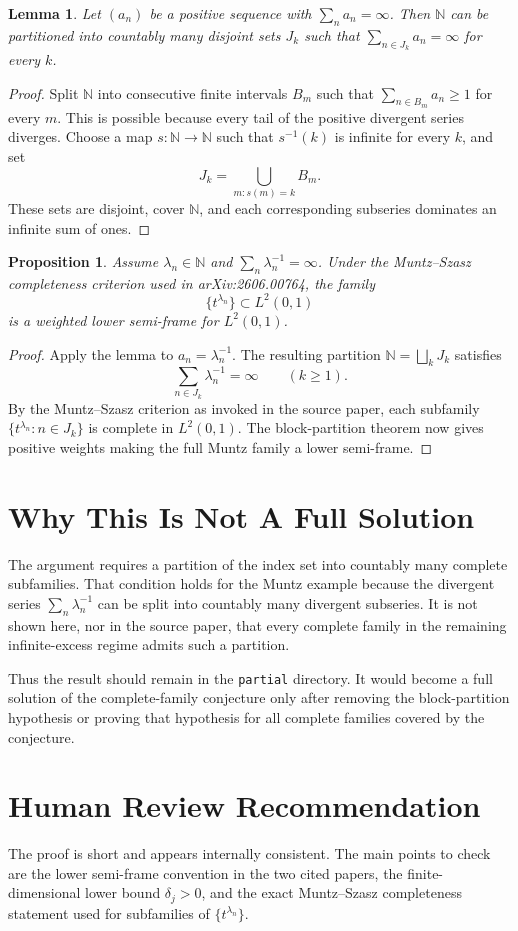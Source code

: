 \documentclass[11pt]{article}
\newtheorem{lemma}{Lemma}
\newtheorem{proposition}{Proposition}
\newcommand{\N}{\mathbb N}
\begin{document}
\begin{lemma}
Let \((a_n)\) be a positive sequence with \(\sum_n a_n=\infty\). Then
\(\N\) can be partitioned into countably many disjoint sets \(J_k\) such
that \(\sum_{n\in J_k}a_n=\infty\) for every \(k\).
\end{lemma}

\begin{proof}
Split \(\N\) into consecutive finite intervals \(B_m\) such that
\(\sum_{n\in B_m}a_n\ge1\) for every \(m\). This is possible because
every tail of the positive divergent series diverges. Choose a map
\(s:\N\to\N\) such that \(s^{-1}(k)\) is infinite for every \(k\), and
set
\[
J_k=\bigcup_{m:s(m)=k}B_m .
\]
These sets are disjoint, cover \(\N\), and each corresponding subseries
dominates an infinite sum of ones.
\end{proof}

\begin{proposition}
Assume \(\lambda_n\in\N\) and \(\sum_n\lambda_n^{-1}=\infty\). Under the
Muntz--Szasz completeness criterion used in arXiv:2606.00764, the family
\[
\{t^{\lambda_n}\}\subset L^2(0,1)
\]
is a weighted lower semi-frame for \(L^2(0,1)\).
\end{proposition}

\begin{proof}
Apply the lemma to \(a_n=\lambda_n^{-1}\). The resulting partition
\(\N=\bigsqcup_kJ_k\) satisfies
\[
\sum_{n\in J_k}\lambda_n^{-1}=\infty
\qquad (k\ge1).
\]
By the Muntz--Szasz criterion as invoked in the source paper, each
subfamily \(\{t^{\lambda_n}:n\in J_k\}\) is complete in \(L^2(0,1)\).
The block-partition theorem now gives positive weights making the full
Muntz family a lower semi-frame.
\end{proof}

\section*{Why This Is Not A Full Solution}

The argument requires a partition of the index set into countably many
complete subfamilies. That condition holds for the Muntz example because
the divergent series \(\sum_n\lambda_n^{-1}\) can be split into
countably many divergent subseries. It is not shown here, nor in the
source paper, that every complete family in the remaining infinite-excess
regime admits such a partition.

Thus the result should remain in the \texttt{partial} directory. It would
become a full solution of the complete-family conjecture only after
removing the block-partition hypothesis or proving that hypothesis for
all complete families covered by the conjecture.

\section*{Human Review Recommendation}

The proof is short and appears internally consistent. The main points to
check are the lower semi-frame convention in the two cited papers, the
finite-dimensional lower bound \(\delta_j>0\), and the exact
Muntz--Szasz completeness statement used for subfamilies of
\(\{t^{\lambda_n}\}\).
\end{document}
